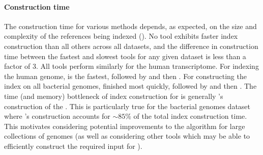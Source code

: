 \begin{table*}
  \begin{center}
    \caption{
    {\small The time and memory required to load the index and query all \kmers in reads of
    the input FASTQ files for different datasets.}
    }
    \vspace{-0.2in}
    \label{tab:query}
  \end{center}
\end{table*}

\paragraph{Construction time} The construction time for various methods depends, as expected,
on the size and complexity of the references being indexed ().  No tool exhibits faster index construction than all others across all datasets, and the difference in construction time between the fastest and slowest tools  for any given dataset is less than a factor of 3.  All tools perform similarly for the human transcriptome.  For indexing the human genome, \bwa is the fastest, followed by \pufferfish and then \kallisto.  For constructing the index on all bacterial genomes, \kallisto finished most quickly, followed by \bwa and then \pufferfish.  The time (and memory) bottleneck of index construction for \pufferfish is generally \twopaco's construction of the \ccdbg.  This is particularly true for the bacterial genomes dataset where \twopaco's \ccdbg construction accounts for $\sim 85\%$ of the total index construction time.  This motivates considering potential improvements to the \twopaco algorithm for large collections of genomes (as well as considering other tools which may be able to efficiently construct the required \ccdbg input for \pufferfish).

